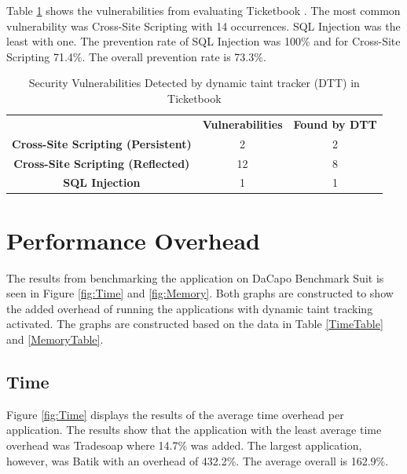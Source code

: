 Table \ref{table:Ticketbook} shows the vulnerabilities from evaluating Ticketbook \parencite{ticketbook}. The most common vulnerability was Cross-Site Scripting with 14 occurrences. SQL Injection was the least with one. The prevention rate of SQL Injection was 100\% and for Cross-Site Scripting 71.4\%. The overall prevention rate is 73.3\%.

\begin{table}[H]
  \centering
  \caption{Security Vulnerabilities Detected by dynamic taint tracker (DTT) in Ticketbook}
  \label{table:Ticketbook}
  \begin{tabular}{ccc}
    & \textbf{Vulnerabilities} & \textbf{Found by DTT} \\
    \textbf{Cross-Site Scripting (Persistent)} & 2             & 2 \\
    \textbf{Cross-Site Scripting (Reflected)}  & 12            & 8 \\
    \textbf{SQL Injection}                     & 1             & 1
  \end{tabular}
\end{table}



\section{Performance Overhead}
\label{Performance}
The results from benchmarking the application on DaCapo Benchmark Suit \parencite{dacapo} is seen in Figure \ref{fig:Time} and \ref{fig:Memory}. Both graphs are constructed to show the added overhead of running the applications with dynamic taint tracking activated. The graphs are constructed based on the data in Table \ref{TimeTable} and \ref{MemoryTable}.



\subsection{Time}
Figure \ref{fig:Time} displays the results of the average time overhead per application. The results show that the application with the least average time overhead was Tradesoap where 14.7\% was added. The largest application, however, was Batik with an overhead of 432.2\%. The average overall is 162.9\%.


